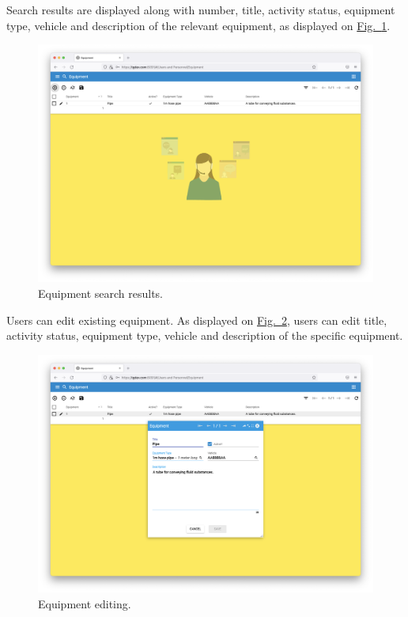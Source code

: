 \newpage
Search results are displayed along with number, title, activity status, equipment type, vehicle and description of the relevant equipment, as displayed on \hyperref[sections/equipment/images/Fig.14]{Fig.~\ref*{sections/equipment/images/Fig.14}}.

    \begin{figure}[!htbp]
	\centering
	\includegraphics[width=0.95\linewidth]{sections/equipment/images/Fig.14.png}
	\caption{Equipment search results.}\label{sections/equipment/images/Fig.14}
	\end{figure}

\newpage
Users can edit existing equipment. As displayed on \hyperref[sections/equipment/images/Fig.15]{Fig.~\ref*{sections/equipment/images/Fig.15}}, users can edit title, activity status, equipment type, vehicle and description of the specific equipment.

    \begin{figure}[!htbp]
	\centering
	\includegraphics[width=0.95\linewidth]{sections/equipment/images/Fig.15.png}
	\caption{Equipment editing.}\label{sections/equipment/images/Fig.15}
	\end{figure}